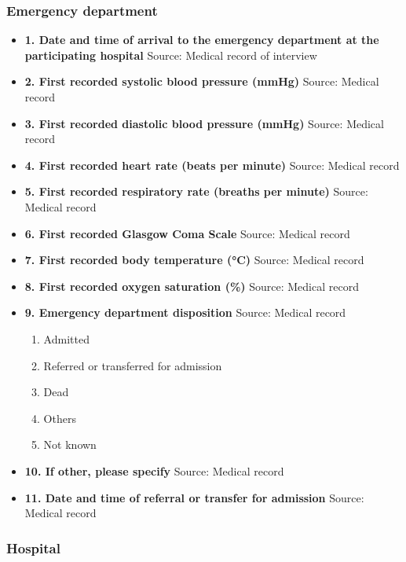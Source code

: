 \documentclass[
]{scrartcl}
\providecommand{\tightlist}{%
  \setlength{\itemsep}{0pt}\setlength{\parskip}{0pt}}\usepackage{longtable,booktabs,array}
\begin{document}
\hypertarget{emergency-department}{%
\subsubsection{Emergency department}\label{emergency-department}}

\begin{itemize}
\item
  \textbf{1. Date and time of arrival to the emergency department at the
  participating hospital} Source: Medical record of interview
\item
  \textbf{2. First recorded systolic blood pressure (mmHg)} Source:
  Medical record
\item
  \textbf{3. First recorded diastolic blood pressure (mmHg)} Source:
  Medical record
\item
  \textbf{4. First recorded heart rate (beats per minute)} Source:
  Medical record
\item
  \textbf{5. First recorded respiratory rate (breaths per minute)}
  Source: Medical record
\item
  \textbf{6. First recorded Glasgow Coma Scale} Source: Medical record
\item
  \textbf{7. First recorded body temperature (°C)} Source: Medical
  record
\item
  \textbf{8. First recorded oxygen saturation (\%)} Source: Medical
  record
\item
  \textbf{9. Emergency department disposition} Source: Medical record

  \begin{enumerate}
  \def\labelenumi{\arabic{enumi}.}
  \tightlist
  \item
    Admitted
  \item
    Referred or transferred for admission
  \item
    Dead
  \item
    Others
  \item
    Not known
  \end{enumerate}
\item
  \textbf{10. If other, please specify} Source: Medical record
\item
  \textbf{11. Date and time of referral or transfer for admission}
  Source: Medical record
\end{itemize}

\hypertarget{hospital}{%
\subsubsection{Hospital}\label{hospital}}
\end{document}
